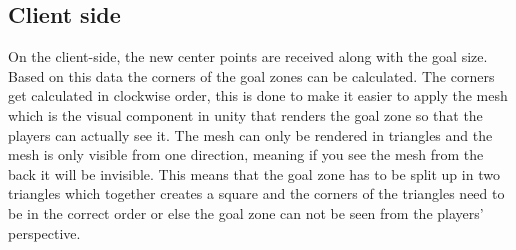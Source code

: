 \subsection{Client side}
On the client-side, the new center points are received along with the goal size.
Based on this data the corners of the goal zones can be calculated.
The corners get calculated in clockwise order, this is done to make it easier to apply the mesh which is the visual component in unity that renders the goal zone so that the players can actually see it.
The mesh can only be rendered in triangles and the mesh is only visible from one direction, meaning if you see the mesh from the back it will be invisible.
This means that the goal zone has to be split up in two triangles which together creates a square and the corners of the triangles need to be in the correct order or else the goal zone can not be seen from the players' perspective.
